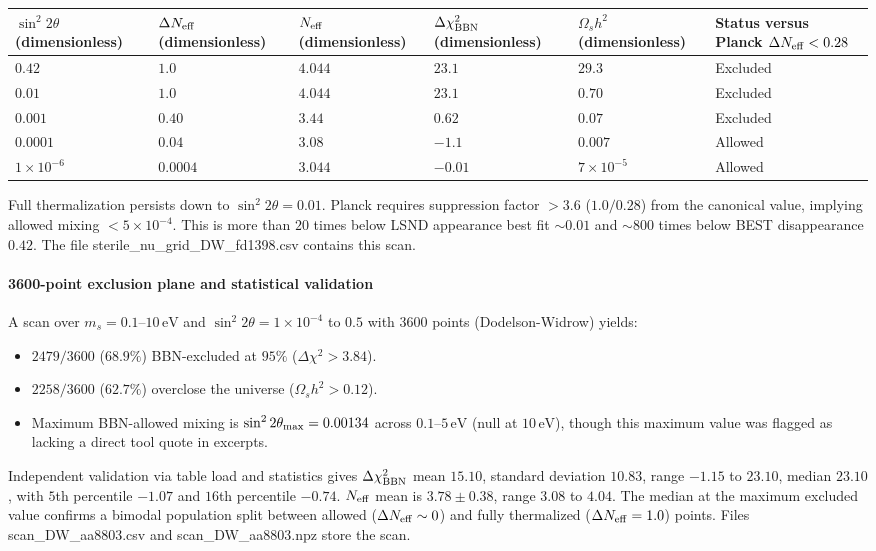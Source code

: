\documentclass[11pt,a4paper]{article}
\begin{document}
\begin{longtable}{@{}p{}p{}p{}p{}p{}p{}@{}}
\toprule
\textbf{$\sin^2 2\theta$ (dimensionless)} & \textbf{$\Delta N_{\rm eff}$ (dimensionless)} & \textbf{$N_{\rm eff}$ (dimensionless)} & \textbf{$\Delta \chi^2_{\rm BBN}$ (dimensionless)} & \textbf{$\Omega_s h^2$ (dimensionless)} & \textbf{Status versus Planck $\Delta N_{\rm eff} < 0.28$} \\ \midrule \endhead
$0.42$ & $1.0$ & $4.044$ & $23.1$ & $29.3$ & Excluded \\
$0.01$ & $1.0$ & $4.044$ & $23.1$ & $0.70$ & Excluded \\
$0.001$ & $0.40$ & $3.44$ & $0.62$ & $0.07$ & Excluded \\
$0.0001$ & $0.04$ & $3.08$ & $-1.1$ & $0.007$ & Allowed \\
$1 \times 10^{-6}$ & $0.0004$ & $3.044$ & $-0.01$ & $7 \times 10^{-5}$ & Allowed \\
\bottomrule\end{longtable}
Full thermalization persists down to $\sin^2 2\theta = 0.01$. Planck requires suppression factor $>3.6$ ($1.0/0.28$) from the canonical value, implying allowed mixing $<5 \times 10^{-4}$. This is more than $20$ times below LSND appearance best fit $\sim 0.01$ and $\sim 800$ times below BEST disappearance $0.42$. The file sterile\_nu\_grid\_DW\_fd1398.csv contains this scan.

\paragraph{3600-point exclusion plane and statistical validation}
A scan over $m_s = 0.1$--$10\,\mathrm{eV}$ and $\sin^2 2\theta = 1 \times 10^{-4}$ to $0.5$ with $3600$ points (Dodelson-Widrow) yields:

\begin{itemize}
  \item $2479/3600$ ($68.9\%$) BBN-excluded at $95\%$ ($\Delta \chi^2 > 3.84$).
  \item $2258/3600$ ($62.7\%$) overclose the universe ($\Omega_s h^2 > 0.12$).
  \item Maximum BBN-allowed mixing is $\sin^2 2\theta_{\rm max} = 0.00134$ across $0.1$--$5\,\mathrm{eV}$ (null at $10\,\mathrm{eV}$), though this maximum value was flagged as lacking a direct tool quote in excerpts.
\end{itemize}
Independent validation via table load and statistics gives $\Delta \chi^2_{\rm BBN}$ mean $15.10$, standard deviation $10.83$, range $-1.15$ to $23.10$, median $23.10$, with $5$th percentile $-1.07$ and $16$th percentile $-0.74$. $N_{\rm eff}$ mean is $3.78 \pm 0.38$, range $3.08$ to $4.04$. The median at the maximum excluded value confirms a bimodal population split between allowed ($\Delta N_{\rm eff} \sim 0$) and fully thermalized ($\Delta N_{\rm eff} = 1.0$) points. Files scan\_DW\_aa8803.csv and scan\_DW\_aa8803.npz store the scan.
\end{document}
